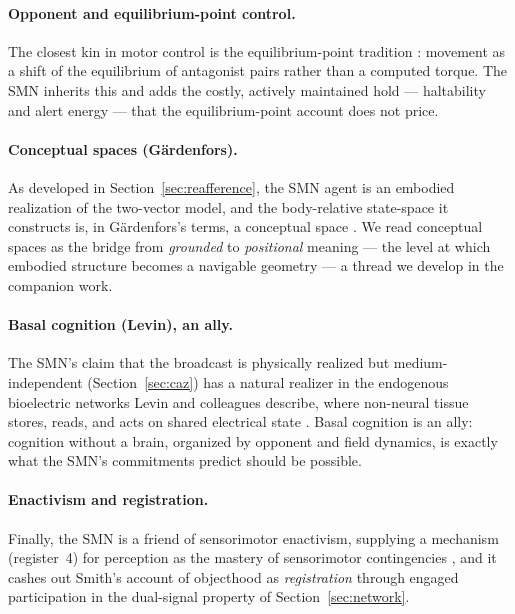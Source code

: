 \documentclass[utf8]{FrontiersinHarvard}
\begin{document}
\paragraph{Opponent and equilibrium-point control.} The closest kin in motor control is the equilibrium-point tradition \citep{Feldman1986_EquilibriumPoint,Latash2008EquilibriumPointHistory}: movement as a shift of the equilibrium of antagonist pairs rather than a computed torque. The SMN inherits this and adds the costly, actively maintained hold --- haltability and alert energy --- that the equilibrium-point account does not price.

\paragraph{Conceptual spaces (G\"ardenfors).} As developed in Section~\ref{sec:reafference}, the SMN agent is an embodied realization of the two-vector model, and the body-relative state-space it constructs is, in G\"ardenfors's terms, a conceptual space \citep{Gardenfors2020Events,Gardenfors2019Robot}. We read conceptual spaces as the bridge from \emph{grounded} to \emph{positional} meaning --- the level at which embodied structure becomes a navigable geometry --- a thread we develop in the companion work.

\paragraph{Basal cognition (Levin), an ally.} The SMN's claim that the broadcast is physically realized but medium-independent (Section~\ref{sec:caz}) has a natural realizer in the endogenous bioelectric networks Levin and colleagues describe, where non-neural tissue stores, reads, and acts on shared electrical state \citep{Levin2014MolecularBioelectricity,LevinPezzulo2017EndogenousBioelectricNetworks}. Basal cognition is an ally: cognition without a brain, organized by opponent and field dynamics, is exactly what the SMN's commitments predict should be possible.

\paragraph{Enactivism and registration.} Finally, the SMN is a friend of sensorimotor enactivism, supplying a mechanism (register~4) for perception as the mastery of sensorimotor contingencies \citep{OReganNoe2001Sensorimotor}, and it cashes out Smith's account of objecthood as \emph{registration} through engaged participation \citep{Smith1996OriginObjects} in the dual-signal property of Section~\ref{sec:network}.
\end{document}
